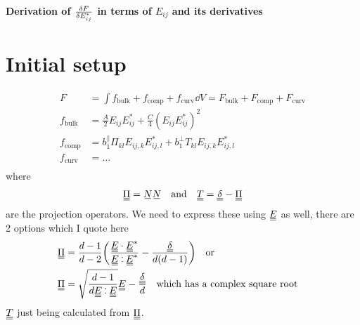 \documentclass{article}
\newcommand\barbelow[1]{\stackunder[1.2pt]{$#1$}{\rule{1.5ex}{.1ex}}}
\newcommand{\su}[1]{\barbelow{#1}}
\newcommand{\du}[1]{\barbelow{\barbelow{#1}}}
\def\onedot{$\mathsurround0pt\ldotp$}
\def\cddot{\mathbin{
    \vcenter{\baselineskip1ex \vspace{-0.1ex}\hbox{\onedot}\hbox{\onedot}}
}}
\begin{document}
\begin{center}
    \LARGE
    \textbf{Derivation of $\fdv{F}{E_{ij}^*}$ in terms of $E_{ij}$ and its derivatives}
\end{center}
\vspace{1em}
\section{Initial setup}
\begin{align}
    F & = \int f_\text{bulk} + f_\text{comp} + f_\text{curv} \dd{V} = F_\text{bulk} + F_\text{comp} + F_\text{curv}\\
    f_\text{bulk} & = \frac{A}{2} E_{ij}E_{ij}^* + \frac{C}{4} (E_{ij}E_{ij}^*)^2 \\
    f_\text{comp} & = b_1^\parallel \Pi_{kl} E_{ij,k}E_{ij,l}^* + b_1^\perp T_{kl} E_{ij,k}E_{ij,l}^* \\
    f_\text{curv} & = \ldots \\
\end{align}
where
\begin{align}
    \du{\Pi} = \su{N} \su{N} && \text{and} && \du{T} = \du{\delta} - \du{\Pi}
\end{align}
are the projection operators. We need to express these using $\du{E}$ as well, there are 2 options which I quote here
\begin{align}
    \du{\Pi} & = \frac{d-1}{d-2}\qty(\frac{\du{E} \cdot \du{E}^*}{\du{E} \cddot \du{E}^*} - \frac{\du{\delta}}{d(d-1)}) \qq{or} \label{eq:piex1}\\
    \du{\Pi} & = \sqrt{\frac{d-1}{d \du{E} \cddot \du{E}}} \du{E} - \frac{\du{\delta}}{d} \label{eq:piex2} \qq{which has a complex square root}
\end{align}
$\du{T}$ just being calculated from $\du{\Pi}$.
\end{document}
